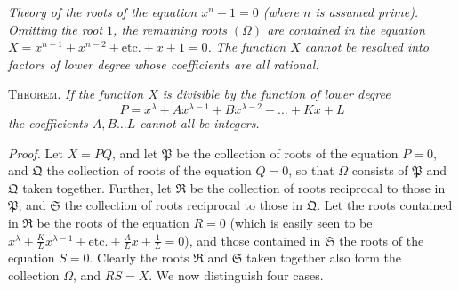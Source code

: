 \begin{center}\textit{Theory of the roots of the equation \(x^n-1=0\) (where \(n\) is assumed prime).} \textit{Omitting the root \(1\), the remaining roots \((\Omega)\) are contained in the equation \(X=x^{n-1}+x^{n-2}+\mathrm{etc.}+x+1=0\).} \textit{The function \(X\) cannot be resolved into factors of lower degree whose coefficients are all rational.}\end{center}


\textsc{Theorem.} \textit{If the function \(X\) is divisible by the function of lower degree} \[P=x^\lambda+Ax^{\lambda-1}+Bx^{\lambda-2}+\ldots+Kx+L\] \textit{the coefficients \(A,\allowbreak B\ldots L\) cannot all be integers.}

\textit{Proof.} Let \(X=PQ\), and let \(\mathfrak P\) be the collection of roots of the equation \(P=0\), and \(\mathfrak Q\) the collection of roots of the equation \(Q=0\), so that \(\Omega\) consists of \(\mathfrak P\) and \(\mathfrak Q\) taken together. Further, let \(\mathfrak R\) be the collection of roots reciprocal to those in \(\mathfrak P\), and \(\mathfrak S\) the collection of roots reciprocal to those in \(\mathfrak Q\). Let the roots contained in \(\mathfrak R\) be the roots of the equation \(R=0\) (which is easily seen to be \(x^\lambda+\frac KLx^{\lambda-1}+\mathrm{etc.}+\frac ALx+\frac1L=0\)), and those contained in \(\mathfrak S\) the roots of the equation \(S=0\). Clearly the roots \(\mathfrak R\) and \(\mathfrak S\) taken together also form the collection \(\Omega\), and \(RS=X\). We now distinguish four cases.

